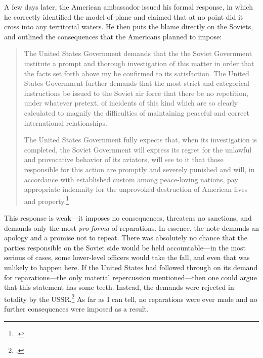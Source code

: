 \documentclass{report}
\begin{document}
\begin{refsegment}
A few days later, the American ambassador issued his formal response, in which he correctly identified the model of plane and claimed that at no point did it cross into any territorial waters. He then puts the blame directly on the Soviets, and outlined the consequences that the Americans planned to impose:

	\begin{quote}
	The United States Government demands that the the Soviet Government institute a prompt and thorough investigation of this matter in order that the facts set forth above my be confirmed to its satisfaction. The United States Government further demands that the most strict and categorical instructions be issued to the Soviet air force that there be no repetition, under whatever pretext, of incidents of this kind which are so clearly calculated to magnify the difficulties of maintaining peaceful and correct international relationships.

	The United States Government fully expects that, when its investigation is completed, the Soviet Government will express its regret for the unlawful and provocative behavior of its aviators, will see to it that those responsible for this action are promptly and severely punished and will, in accordance with established custom among peace-loving nations, pay appropriate indemnity for the unprovoked destruction of American lives and property.\footcite{the_associated_press_text_1950}
	\end{quote}

This response is weak---it imposes no consequences, threatens no sanctions, and demands only the most \emph{pro forma} of reparations. In essence, the note demands an apology and a promise not to repeat. There was absolutely no chance that the parties responsible on the Soviet side would be held accountable---in the most serious of cases, some lower-level officers would take the fall, and even that was unlikely to happen here. If the United States had followed through on its demand for reparations---the only material repercussion mentioned---then one could argue that this statement has some teeth. Instead, the demands were rejected in totality by the USSR.\footcite{salisbury_kremlin_1950} As far as I can tell, no reparations were ever made and no further consequences were imposed as a result.


\end{refsegment}
\end{document}
